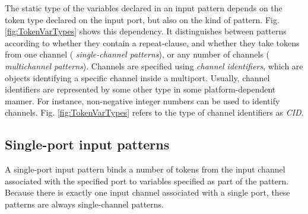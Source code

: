 \begin{table}[t]
\caption{Token variable types depending on input pattern kind and
  presence of repeat-clause. ({\tt T} is the token type of the
  corresponding input port.)}\label{fig:TokenVarTypes}

\end{table}

 
 

The static type of the variables declared in an input pattern depends
on the token type declared on the input port, but also on the kind of
pattern. Fig. \ref{fig:TokenVarTypes} shows this dependency. It
distinguishes between patterns according to whether they contain a
repeat-clause, and whether they take tokens from one channel ({\em
  single-channel patterns}), or any number of channels ({\em
  multichannel patterns}). Channels are specified using {\em channel
  identifiers}, which are objects identifying a specific channel
inside a multiport. Usually, channel identifiers are represented by
some other type in some platform-dependent manner. For instance,
non-negative integer numbers can be used to identify channels. Fig.
\ref{fig:TokenVarTypes} refers to the type of channel identifiers as
{\em CID}.

\subsection{Single-port input patterns}


A single-port
input pattern binds a number of tokens from the input channel
associated with the specified port to variables specified as part of
the pattern. Because there is exactly one input channel associated
with a single port, these patterns are always single-channel patterns.

